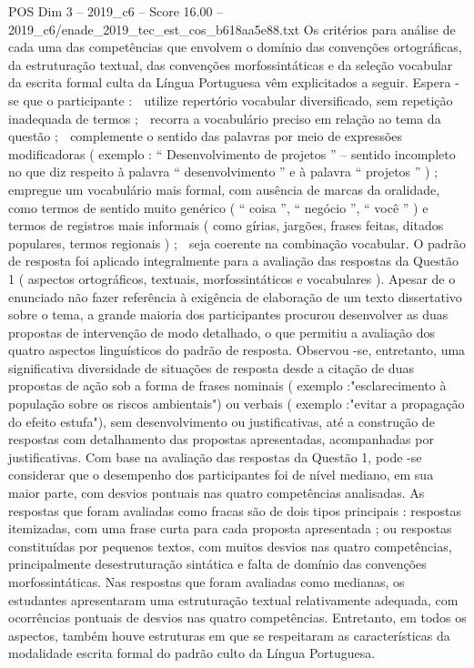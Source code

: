 \begin{textsample}{POS Dim 3 – 2019\_c6 – Score 16.00 – 2019\_c6/enade\_2019\_tec\_est\_cos\_b618aa5e88.txt}
Os critérios para análise de cada uma das competências que envolvem o domínio das convenções ortográficas, da estruturação textual, das convenções morfossintáticas e da seleção vocabular da escrita formal culta da Língua Portuguesa vêm explicitados a seguir.
Espera -se que o participante :  utilize repertório vocabular diversificado, sem repetição inadequada de termos ;  recorra a vocabulário preciso em relação ao tema da questão ;  complemente o sentido das palavras por meio de expressões modificadoras ( exemplo : “ Desenvolvimento de projetos ” – sentido incompleto no que diz respeito à palavra “ desenvolvimento ” e à palavra “ projetos ” ) ;  empregue um vocabulário mais formal, com ausência de marcas da oralidade, como termos de sentido muito genérico ( “ coisa ”, “ negócio ”, “ você ” ) e termos de registros mais informais ( como gírias, jargões, frases feitas, ditados populares, termos regionais ) ;  seja coerente na combinação vocabular.
O padrão de resposta foi aplicado integralmente para a avaliação das respostas da Questão 1 ( aspectos ortográficos, textuais, morfossintáticos e vocabulares ).
Apesar de o enunciado não fazer referência à exigência de elaboração de um texto dissertativo sobre o tema, a grande maioria dos participantes procurou desenvolver as duas propostas de intervenção de modo detalhado, o que permitiu a avaliação dos quatro aspectos linguísticos do padrão de resposta.
Observou -se, entretanto, uma significativa diversidade de situações de resposta desde a citação de duas propostas de ação sob a forma de frases nominais ( exemplo :"esclarecimento à população sobre os riscos ambientais") ou verbais ( exemplo :"evitar a propagação do efeito estufa"), sem desenvolvimento ou justificativas, até a construção de respostas com detalhamento das propostas apresentadas, acompanhadas por justificativas.
Com base na avaliação das respostas da Questão 1, pode -se considerar que o desempenho dos participantes foi de nível mediano, em sua maior parte, com desvios pontuais nas quatro competências analisadas.
As respostas que foram avaliadas como fracas são de dois tipos principais : respostas itemizadas, com uma frase curta para cada proposta apresentada ; ou respostas constituídas por pequenos textos, com muitos desvios nas quatro competências, principalmente desestruturação sintática e falta de domínio das convenções morfossintáticas.
Nas respostas que foram avaliadas como medianas, os estudantes apresentaram uma estruturação textual relativamente adequada, com ocorrências pontuais de desvios nas quatro competências.
Entretanto, em todos os aspectos, também houve estruturas em que se respeitaram as características da modalidade escrita formal do padrão culto da Língua Portuguesa.

\end{textsample}
